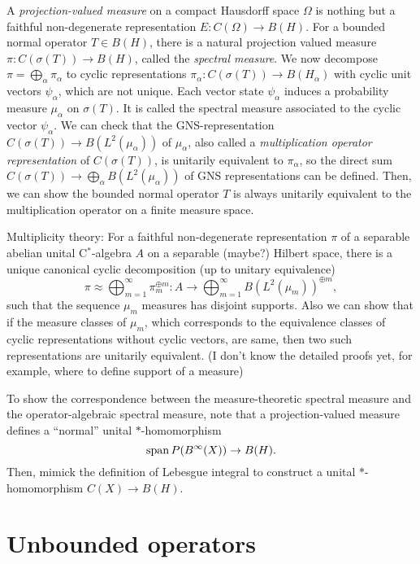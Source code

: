 \documentclass{../../large}
\begin{document}
\begin{prb}
A \emph{projection-valued measure} on a compact Hausdorff space $\Omega$ is nothing but a faithful non-degenerate representation $E:C(\Omega)\to B(H)$.
For a bounded normal operator $T\in B(H)$, there is a natural projection valued measure $\pi:C(\sigma(T))\to B(H)$, called the \emph{spectral measure}.
We now decompose $\pi=\bigoplus_\alpha\pi_\alpha$ to cyclic representations $\pi_\alpha:C(\sigma(T))\to B(H_\alpha)$ with cyclic unit vectors $\psi_\alpha$, which are not unique.
Each vector state $\psi_\alpha$ induces a probability measure $\mu_\alpha$ on $\sigma(T)$.
It is called the spectral measure associated to the cyclic vector $\psi_\alpha$.
We can check that the GNS-representation $C(\sigma(T))\to B(L^2(\mu_\alpha))$ of $\mu_\alpha$, also called a \emph{multiplication operator representation} of $C(\sigma(T))$, is unitarily equivalent to $\pi_\alpha$, so the direct sum $C(\sigma(T))\to\bigoplus_\alpha B(L^2(\mu_\alpha))$ of GNS representations can be defined.
Then, we can show the bounded normal operator $T$ is always unitarily equivalent to the multiplication operator on a finite measure space.

Multiplicity theory:
For a faithful non-degenerate representation $\pi$ of a separable abelian unital C$^*$-algebra $A$ on a separable (maybe?) Hilbert space, there is a unique canonical cyclic decomposition (up to unitary equivalence)
\[\pi\approx\bigoplus_{m=1}^\infty\pi_m^{\oplus m}:A\to\bigoplus_{m=1}^\infty B(L^2(\mu_m))^{\oplus m},\]
such that the sequence $\mu_m$ measures has disjoint supports.
Also we can show that if the measure classes of $\mu_m$, which corresponds to the equivalence classes of cyclic representations without cyclic vectors, are same, then two such representations are unitarily equivalent.
(I don't know the detailed proofs yet, for example, where to define support of a measure)
\end{prb}


To show the correspondence between the measure-theoretic spectral measure and the operator-algebraic spectral measure, note that a projection-valued measure defines a ``normal'' unital $*$-homomorphism
\[\operatorname{span} P(B^\infty(X))\to B(H).\]
Then, mimick the definition of Lebesgue integral to construct a unital $*$-homomorphism $C(X)\to B(H)$.


\chapter{Unbounded operators}
\end{document}
